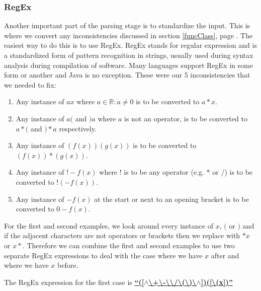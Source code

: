 \documentclass[../../../../../main.tex]{subfiles}
\begin{document}
\subsubsection{RegEx}
Another important part of the parsing stage is to standardize the input. This is where we convert any inconsistencies discussed in section \ref{funcClass}, page \pageref{funcClass}. The easiest way to do this is to use RegEx\cite{regex}. RegEx stands for regular expression and is a standardized form of pattern recognition in strings, usually used during syntax analysis during compilation of software. Many languages support RegEx in some form or another and Java is no exception. These were our 5 inconsistencies that we needed to fix:
\begin{enumerate}
	\item Any instance of $ax$ where $a \in  \mathbb{R} : a \neq 0$ is to be converted to $a*x$.
	\item Any instance of $a($ and $)a$ where $a$ is not an operator, is to be converted to $a*($ and $)*a$ respectively.
	\item Any instance of $(f(x))(g(x))$ is to be converted to $(f(x))*(g(x))$.
	\item Any instance of $!-f(x)$ where $!$ is to be any operator (e.g. $*$ or $/$) is to be converted to $! (-f(x))$.
	\item Any instance of $-f(x)$ at the start or next to an opening bracket is to be converted to $0 - f(x)$.
\end{enumerate}
For the first and second examples, we look around every instance of $x$, $($ or $)$ and if the adjacent characters are not operators or brackets then we replace with $*x$ or $x*$. Therefore we can combine the first and second examples to use two separate RegEx expressions to deal with the case where we have $x$ after and where we have $x$ before.\par
The RegEx expression for the first case is
\textbf{\underline{``([$\wedge$\textbackslash+\textbackslash-\textbackslash*\textbackslash/\textbackslash(\textbackslash)\textbackslash$\wedge$])([\textbackslash(x])''}}
\end{document}
